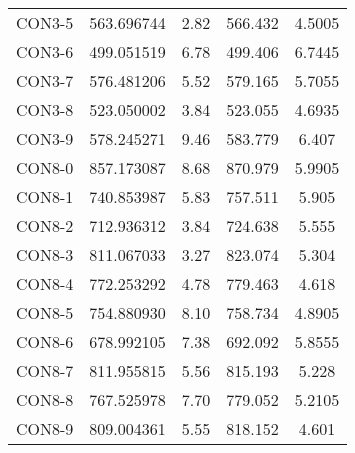 \begin{table}[ht]
\begin{tabular}{c c c c c}
CON3-5 & 563.696744 & 2.82 & 566.432 & 4.5005 \\
CON3-6 & 499.051519 & 6.78 & 499.406 & 6.7445 \\
CON3-7 & 576.481206 & 5.52 & 579.165 & 5.7055 \\
CON3-8 & 523.050002 & 3.84 & 523.055 & 4.6935 \\
CON3-9 & 578.245271 & 9.46 & 583.779 & 6.407 \\
CON8-0 & 857.173087 & 8.68 & 870.979 & 5.9905 \\
CON8-1 & 740.853987 & 5.83 & 757.511 & 5.905 \\
CON8-2 & 712.936312 & 3.84 & 724.638 & 5.555 \\
CON8-3 & 811.067033 & 3.27 & 823.074 & 5.304 \\
CON8-4 & 772.253292 & 4.78 & 779.463 & 4.618 \\
CON8-5 & 754.880930 & 8.10 & 758.734 & 4.8905 \\
CON8-6 & 678.992105 & 7.38 & 692.092 & 5.8555 \\
CON8-7 & 811.955815 & 5.56 & 815.193 & 5.228 \\
CON8-8 & 767.525978 & 7.70 & 779.052 & 5.2105 \\
CON8-9 & 809.004361 & 5.55 & 818.152 & 4.601 \\
[1ex]\hline
\end{tabular}
\label{table:nonlin}
\end{table} \clearpage
